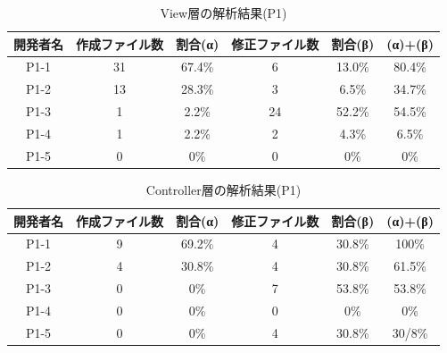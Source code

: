 \documentclass{funthesis}
\begin{document}
\begin{table}[H]
  \begin{center}
\begin{tabular}{|c|c|c|c|c||c|}
\hline
開発者名&作成ファイル数&割合(α)&修正ファイル数&割合(β)&(α)+(β)\\ \hline
P1-1 & 31 & 67.4\% & 6 & 13.0\% & 80.4\%\\ \hline \hline
P1-2 & 13 & 28.3\% & 3 & 6.5\% & 34.7\%\\ \hline \hline
P1-3 & 1 & 2.2\% & 24 & 52.2\% & 54.5\%\\ \hline \hline
P1-4 & 1 & 2.2\% & 2 & 4.3\% & 6.5\%\\ \hline \hline
P1-5 & 0 & 0\% & 0 & 0\% & 0\%\\ \hline \hline
\end{tabular}
  \end{center}
  \caption{View層の解析結果(P1)}    \label{sample}
\end{table}
\begin{table}[H]
  \begin{center}
\begin{tabular}{|c|c|c|c|c||c|}
\hline
開発者名&作成ファイル数&割合(α)&修正ファイル数&割合(β)&(α)+(β)\\ \hline
P1-1 & 9 & 69.2\% & 4 & 30.8\% & 100\%\\ \hline \hline
P1-2 & 4 & 30.8\% & 4 & 30.8\% & 61.5\%\\ \hline \hline
P1-3 & 0 & 0\% & 7 & 53.8\% & 53.8\%\\ \hline \hline
P1-4 & 0 & 0\% & 0 & 0\% & 0\%\\ \hline \hline
P1-5 & 0 & 0\% & 4 & 30.8\% & 30/8\%\\ \hline \hline
\end{tabular}
  \end{center}
  \caption{Controller層の解析結果(P1)}    \label{sample}
\end{table}
\end{document}
